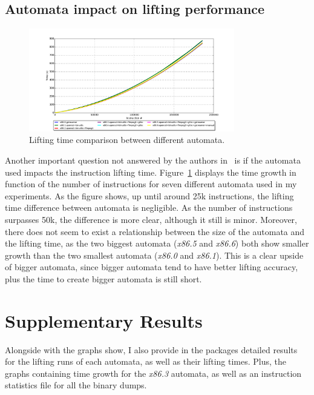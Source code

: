 \documentclass[12pt]{article}
\begin{document}
\subsection{Automata impact on lifting performance}\label{subsec:automata_impact}

\begin{figure}[ht]
\centering
\includegraphics[width=0.8\textwidth]{automata_comparison}%
\caption{Lifting time comparison between different automata.}
\label{fig:automata_time}
\end{figure}

Another important question not answered by the authors in~\cite{Hasabnis2014} is if the automata used impacts the instruction lifting time. Figure~\ref{fig:automata_time} displays the time growth in function of the number of instructions for seven different automata used in my experiments. As the figure shows, up until around 25k instructions, the lifting time difference between automata is negligible. As the number of instructions surpasses 50k, the difference is more clear, although it still is minor. Moreover, there does not seem to exist a relationship between the size of the automata and the lifting time, as the two biggest automata (\textit{x86.5} and \textit{x86.6}) both show smaller growth than the two smallest automata (\textit{x86.0} and \textit{x86.1}). This is a clear upside of bigger automata, since bigger automata tend to have better lifting accuracy, plus the time to create bigger automata is still short.

\section{Supplementary Results}

Alongside with the graphs show, I also provide in the packages detailed results for the lifting runs of each automata, as well as their lifting times. Plus, the graphs containing time growth for the \textit{x86.3} automata, as well as an instruction statistics file for all the binary dumps.
\end{document}
